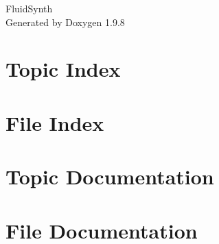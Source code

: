 \documentclass[twoside]{book}
\newcommand{\+}{\discretionary{\mbox{\scriptsize$\hookleftarrow$}}{}{}}
\newcommand{\clearemptydoublepage}{%
    \newpage{\pagestyle{empty}\cleardoublepage}%
  }
\begin{document}
  \raggedbottom
    \hypersetup{pageanchor=false,
                bookmarksnumbered=true,
                pdfencoding=unicode
               }
  \begin{titlepage}
  \vspace*{7cm}
  \begin{center}%
  {\Large Fluid\+Synth}\\
  \vspace*{1cm}
  {\large Generated by Doxygen 1.9.8}\\
  \end{center}
  \end{titlepage}
  \clearemptydoublepage
  \tableofcontents
  \clearemptydoublepage
  \hypersetup{pageanchor=true}

\chapter{Topic Index}

\chapter{File Index}

\chapter{Topic Documentation}










\chapter{File Documentation}
















  \backmatter
  \newpage
  \clearemptydoublepage
  \printindex
\end{document}

